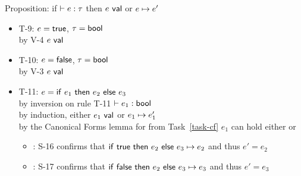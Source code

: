 \documentclass{article}
\begin{document}
Proposition: if $ \vdash e : \tau$ then $e ~\mathsf{val}$ or $e \mapsto e'$
\begin{itemize}
    \item T-9: $e = \mathsf{true}$, $\tau = \mathsf{bool}$\\
        by V-4 $e ~\mathsf{val}$
    \item T-10: $e = \mathsf{false}$, $\tau = \mathsf{bool}$\\
        by V-3 $e ~\mathsf{val}$
    \item T-11: $e = \mathsf{if}~e_1~\mathsf{then}~e_2~\mathsf{else}~e_3$\\
        by inversion on rule T-11 $ \vdash e_1 : \mathsf{bool}$\\
        by induction, either $e_1 ~\mathsf{val}$ or $e_1 \mapsto e_1'$\\
        by the Canonical Forms lemma for from Task~\ref{task-cf} $e_1$ can hold either \kwtrue or \kwfalse
        \begin{itemize}
            \item \kwtrue : S-16 confirms that $\mathsf{if}~\mathsf{true}~\mathsf{then}~e_2~\mathsf{else}~e_3 \mapsto e_2$ and thus $e' = e_2$
            \item \kwfalse : S-17 confirms that $\mathsf{if}~\mathsf{false}~\mathsf{then}~e_2~\mathsf{else}~e_3 \mapsto e_3$ and thus $e' = e_3$
        \end{itemize}

\end{itemize}
\end{document}
